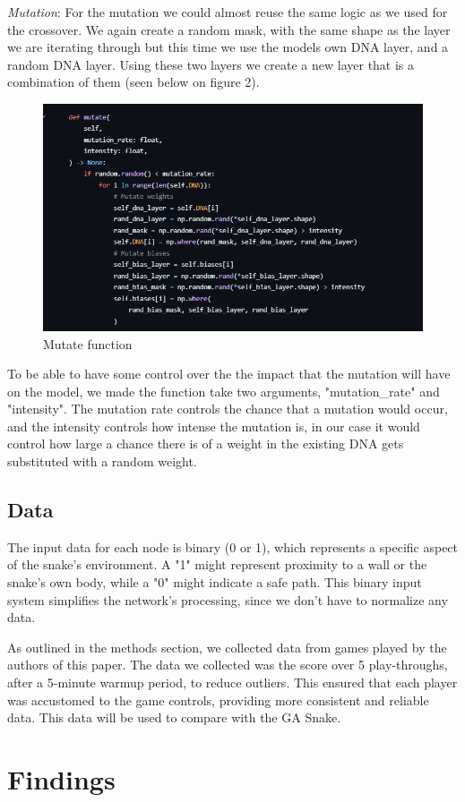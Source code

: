\documentclass{article}
\begin{document}
\newline
\newline
\textit{Mutation}:
For the mutation we could almost reuse the same logic as we used for the crossover. We again create a random mask, with the same shape as the layer we are iterating through but this time we use the models own DNA layer, and a random DNA layer. Using these two layers we create a new layer that is a combination of them (seen below on figure 2).
\begin{figure}[h!]
    \centering
    \includegraphics[width=0.3\linewidth]{mutate-function.png}
    \caption{Mutate function}
    \label{fig:enter-label}
\end{figure}
\newline
To be able to have some control over the the impact that the mutation will have on the model, we made the function take two arguments, "mutation\_rate" and "intensity". The mutation rate  controls the chance that a mutation would occur, and the intensity controls how intense the mutation is, in our case it would control how large a chance there is of a weight in the existing DNA gets substituted with a random weight.

\subsection{Data}
The input data for each node is binary (0 or 1), which represents a specific aspect of the snake's environment. A "1" might represent proximity to a wall or the snake's own body, while a "0" might indicate a safe path. This binary input system simplifies the network's processing, since we don't have to normalize any data. 
\newline

As outlined in the methods section, we collected data from games played by the authors of this paper. The data we collected was the score over 5 play-throughs, after a 5-minute warmup period, to reduce outliers. This ensured that each player was accustomed to the game controls, providing more consistent and reliable data.
This data will be used to compare with the GA Snake.




\section{Findings}
\end{document}
